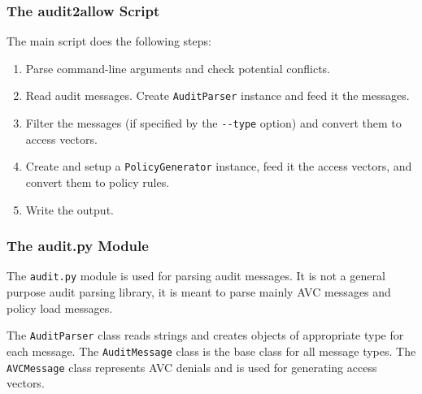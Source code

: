 \subsubsection{The audit2allow Script}

The main script does the following steps:
\begin{enumerate}
    \item Parse command-line arguments and check potential conflicts.
    \item Read audit messages. Create \texttt{AuditParser} instance and feed it
        the messages.
    \item Filter the messages (if specified by the \texttt{-{}-type} option) and
        convert them to access vectors.
    \item Create and setup a \texttt{PolicyGenerator} instance, feed it the
        access vectors, and convert them to policy rules.
    \item Write the output.
\end{enumerate}

\subsubsection{The audit.py Module}

The \texttt{audit.py} module is used for parsing audit messages. It is not a
general purpose audit parsing library, it is meant to parse mainly AVC messages
and policy load messages.

The \texttt{AuditParser} class reads strings and creates objects of appropriate
type for each message. The \texttt{AuditMessage} class is the base class for all
message types. The \texttt{AVCMessage} class represents AVC denials and is used
for generating access vectors.

